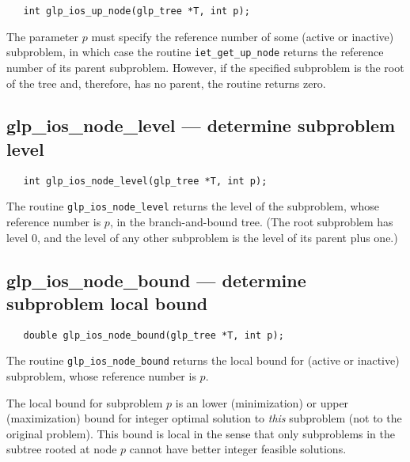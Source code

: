 \synopsis

\begin{verbatim}
   int glp_ios_up_node(glp_tree *T, int p);
\end{verbatim}

\returns

The parameter $p$ must specify the reference number of some (active or
inactive) subproblem, in which case the routine \verb|iet_get_up_node|
returns the reference number of its parent subproblem. However, if the
specified subproblem is the root of the tree and, therefore, has
no parent, the routine returns zero.

\subsection{glp\_ios\_node\_level --- determine subproblem level}

\synopsis

\begin{verbatim}
   int glp_ios_node_level(glp_tree *T, int p);
\end{verbatim}

\returns

The routine \verb|glp_ios_node_level| returns the level of the
subproblem, whose reference number is $p$, in the branch-and-bound
tree. (The root subproblem has level 0, and the level of any other
subproblem is the level of its parent plus one.)

\subsection{glp\_ios\_node\_bound --- determine subproblem local bound}

\synopsis

\begin{verbatim}
   double glp_ios_node_bound(glp_tree *T, int p);
\end{verbatim}

\returns

The routine \verb|glp_ios_node_bound| returns the local bound for
(active or inactive) subproblem, whose reference number is $p$.

\newpage


The local bound for subproblem $p$ is an lower (minimization) or upper
(maximization) bound for integer optimal solution to {\it this}
subproblem (not to the original problem). This bound is local in the
sense that only subproblems in the subtree rooted at node $p$ cannot
have better integer feasible solutions.

